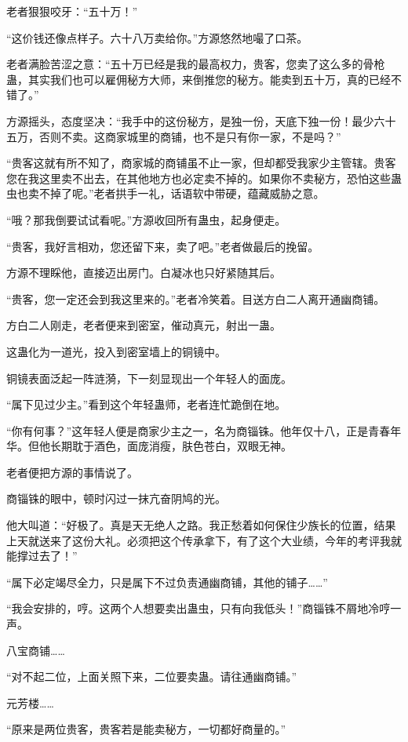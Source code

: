 \begin{this_body}
老者狠狠咬牙：“五十万！”

“这价钱还像点样子。六十八万卖给你。”方源悠然地嘬了口茶。

老者满脸苦涩之意：“五十万已经是我的最高权力，贵客，您卖了这么多的骨枪蛊，其实我们也可以雇佣秘方大师，来倒推您的秘方。能卖到五十万，真的已经不错了。”

方源摇头，态度坚决：“我手中的这份秘方，是独一份，天底下独一份！最少六十五万，否则不卖。这商家城里的商铺，也不是只有你一家，不是吗？”

“贵客这就有所不知了，商家城的商铺虽不止一家，但却都受我家少主管辖。贵客您在我这里卖不出去，在其他地方也必定卖不掉的。如果你不卖秘方，恐怕这些蛊虫也卖不掉了呢。”老者拱手一礼，话语软中带硬，蕴藏威胁之意。

“哦？那我倒要试试看呢。”方源收回所有蛊虫，起身便走。

“贵客，我好言相劝，您还留下来，卖了吧。”老者做最后的挽留。

方源不理睬他，直接迈出房门。白凝冰也只好紧随其后。

“贵客，您一定还会到我这里来的。”老者冷笑着。目送方白二人离开通幽商铺。

方白二人刚走，老者便来到密室，催动真元，射出一蛊。

这蛊化为一道光，投入到密室墙上的铜镜中。

铜镜表面泛起一阵涟漪，下一刻显现出一个年轻人的面庞。

“属下见过少主。”看到这个年轻蛊师，老者连忙跪倒在地。

“你有何事？”这年轻人便是商家少主之一，名为商锱铢。他年仅十八，正是青春年华。但他长期耽于酒色，面庞消瘦，肤色苍白，双眼无神。

老者便把方源的事情说了。

商锱铢的眼中，顿时闪过一抹亢奋阴鸠的光。

他大叫道：“好极了。真是天无绝人之路。我正愁着如何保住少族长的位置，结果上天就送来了这份大礼。必须把这个传承拿下，有了这个大业绩，今年的考评我就能撑过去了！”

“属下必定竭尽全力，只是属下不过负责通幽商铺，其他的铺子……”

“我会安排的，哼。这两个人想要卖出蛊虫，只有向我低头！”商锱铢不屑地冷哼一声。

八宝商铺……

“对不起二位，上面关照下来，二位要卖蛊。请往通幽商铺。”

元芳楼……

“原来是两位贵客，贵客若是能卖秘方，一切都好商量的。”


\end{this_body}
